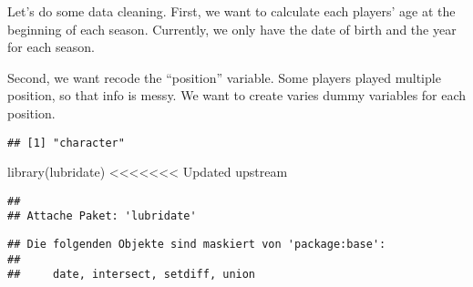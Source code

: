 \documentclass[
]{book}
\newenvironment{Shaded}{\begin{snugshade}}{\end{snugshade}}
\newcommand{\AttributeTok}[1]{\textcolor[rgb]{0.77,0.63,0.00}{#1}}
\newcommand{\AttributeTok}[1]{\textcolor[rgb]{0.13,0.29,0.53}{#1}}
\newcommand{\CommentTok}[1]{\textcolor[rgb]{0.56,0.35,0.01}{\textit{#1}}}
\newcommand{\FunctionTok}[1]{\textcolor[rgb]{0.00,0.00,0.00}{#1}}
\newcommand{\FunctionTok}[1]{\textcolor[rgb]{0.13,0.29,0.53}{\textbf{#1}}}
\newcommand{\NormalTok}[1]{#1}
\newcommand{\OtherTok}[1]{\textcolor[rgb]{0.56,0.35,0.01}{#1}}
\newcommand{\SpecialCharTok}[1]{\textcolor[rgb]{0.00,0.00,0.00}{#1}}
\newcommand{\SpecialCharTok}[1]{\textcolor[rgb]{0.81,0.36,0.00}{\textbf{#1}}}
\begin{document}
Let's do some data cleaning. First, we want to calculate each players' age at the
beginning of each season. Currently, we only have the date of birth and the year
for each season.

Second, we want recode the ``position'' variable. Some players played multiple
position, so that info is messy. We want to create varies dummy variables
for each position.

\begin{Shaded}
\end{Shaded}

\begin{verbatim}
## [1] "character"
\end{verbatim}

\begin{Shaded}
\begin{Highlighting}[]
\FunctionTok{library}\NormalTok{(lubridate)}
<<<<<<< Updated upstream
\end{Highlighting}
\end{Shaded}

\begin{verbatim}
## 
## Attache Paket: 'lubridate'
\end{verbatim}

\begin{verbatim}
## Die folgenden Objekte sind maskiert von 'package:base':
## 
##     date, intersect, setdiff, union
\end{verbatim}

\begin{Shaded}
\end{Shaded}
\end{document}
